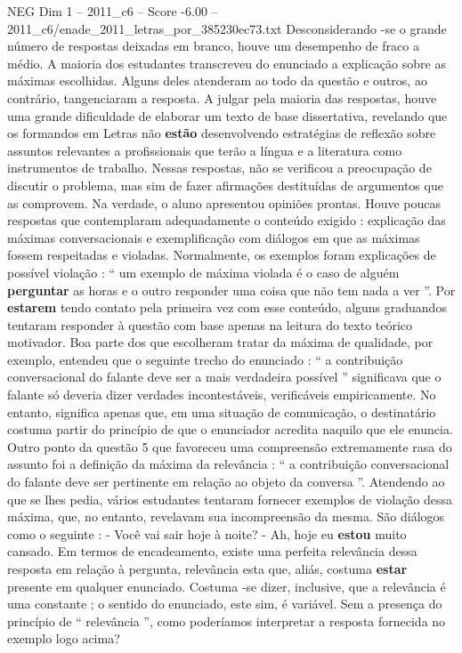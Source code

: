 \begin{textsample}{NEG Dim 1 – 2011\_c6 – Score -6.00 – 2011\_c6/enade\_2011\_letras\_por\_385230ec73.txt}
Desconsiderando -se o grande número de respostas deixadas em branco, houve um desempenho de fraco a médio.
A maioria dos estudantes transcreveu do enunciado a explicação sobre as máximas escolhidas.
Alguns deles atenderam ao todo da questão e outros, ao contrário, tangenciaram a resposta.
A julgar pela maioria das respostas, houve uma grande dificuldade de elaborar um texto de base dissertativa, revelando que os formandos em Letras não \textbf{estão} desenvolvendo estratégias de reflexão sobre assuntos relevantes a profissionais que terão a língua e a literatura como instrumentos de trabalho.
Nessas respostas, não se verificou a preocupação de discutir o problema, mas sim de fazer afirmações destituídas de argumentos que as comprovem.
Na verdade, o aluno apresentou opiniões prontas.
Houve poucas respostas que contemplaram adequadamente o conteúdo exigido : explicação das máximas conversacionais e exemplificação com diálogos em que as máximas fossem respeitadas e violadas.
Normalmente, os exemplos foram explicações de possível violação : “ um exemplo de máxima violada é o caso de alguém \textbf{perguntar} as horas e o outro responder uma coisa que não tem nada a ver ”.
Por \textbf{estarem} tendo contato pela primeira vez com esse conteúdo, alguns graduandos tentaram responder à questão com base apenas na leitura do texto teórico motivador.
Boa parte dos que escolheram tratar da máxima de qualidade, por exemplo, entendeu que o seguinte trecho do enunciado : “ a contribuição conversacional do falante deve ser a mais verdadeira possível ” significava que o falante só deveria dizer verdades incontestáveis, verificáveis empiricamente.
No entanto, significa apenas que, em uma situação de comunicação, o destinatário costuma partir do princípio de que o enunciador acredita naquilo que ele enuncia.
Outro ponto da questão 5 que favoreceu uma compreensão extremamente rasa do assunto foi a definição da máxima da relevância : “ a contribuição conversacional do falante deve ser pertinente em relação ao objeto da conversa ”.
Atendendo ao que se lhes pedia, vários estudantes tentaram fornecer exemplos de violação dessa máxima, que, no entanto, revelavam sua incompreensão da mesma.
São diálogos como o seguinte : - Você vai sair hoje à noite? - Ah, hoje eu \textbf{estou} muito cansado.
Em termos de encadeamento, existe uma perfeita relevância dessa resposta em relação à pergunta, relevância esta que, aliás, costuma \textbf{estar} presente em qualquer enunciado.
Costuma -se dizer, inclusive, que a relevância é uma constante ; o sentido do enunciado, este sim, é variável.
Sem a presença do princípio de “ relevância ”, como poderíamos interpretar a resposta fornecida no exemplo logo acima?

\end{textsample}
